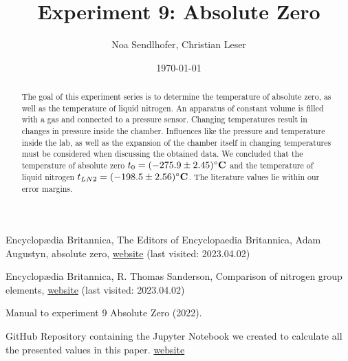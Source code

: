 \documentclass[12pt,a4paper]{article}
\title{Experiment 9: Absolute Zero}
\author{Noa Sendlhofer, Christian Leser}
\date{\today}
\begin{document}
\maketitle

\begin{abstract}
    The goal of this experiment series is to determine the temperature of absolute zero, 
    as well as the temperature of liquid nitrogen. An apparatus of constant volume is filled with a gas
    and connected to a pressure sensor. Changing temperatures result in changes in pressure inside the chamber.
    Influences like the pressure and temperature inside the lab, as well as the expansion of the chamber itself
    in changing temperatures must be considered when discussing the obtained data. We concluded that the temperature
    of absolute zero $t_0 = (-275.9 \pm 2.45)\si{\bf\celsius}$ and the temperature of liquid nitrogen $t_{LN2} = (-198.5 \pm 2.56)\si{\bf\celsius}$.
    The literature values lie within our error margins.

\end{abstract}

\tableofcontents





\newpage





\newpage






\begin{thebibliography}{99}

Encyclop\ae dia Britannica, The Editors of Encyclopaedia Britannica, Adam Augustyn, absolute zero, \href{https://www.britannica.com/science/absolute-zero}{website} (last visited: 2023.04.02)

Encyclop\ae dia Britannica, R. Thomas Sanderson, Comparison of nitrogen group elements, \href{https://www.britannica.com/science/nitrogen-group-element/Comparison-of-nitrogen-group-elements}{website} (last visited: 2023.04.02)

Manual to experiment 9 Absolute Zero (2022).

GitHub Repository containing the Jupyter Notebook we created to calculate all the presented values in this paper. \href{https://github.com/Noothless/Physik-Absolute-Zero}{website}

\end{thebibliography}
\end{document}
